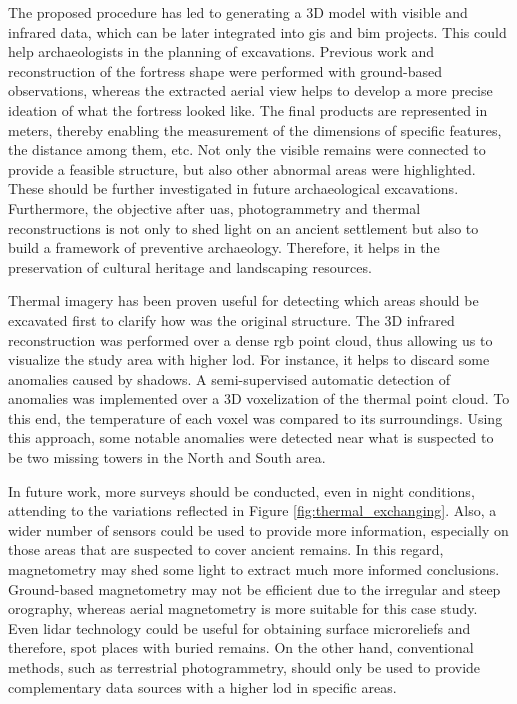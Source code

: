 The proposed procedure has led to generating a 3D model with visible and infrared data, which can be later integrated into \acrshort{gis} and \acrshort{bim} projects. This could help archaeologists in the planning of excavations. Previous work and reconstruction of the fortress shape were performed with ground-based observations, whereas the extracted aerial view helps to develop a more precise ideation of what the fortress looked like. The final products are represented in meters, thereby enabling the measurement of the dimensions of specific features, the distance among them, etc. Not only the visible remains were connected to provide a feasible structure, but also other abnormal areas were highlighted. These should be further investigated in future archaeological excavations. Furthermore, the objective after \acrshort{uas}, photogrammetry and thermal reconstructions is not only to shed light on an ancient settlement but also to build a framework of preventive archaeology. Therefore, it helps in the preservation of cultural heritage and landscaping resources. 

Thermal imagery has been proven useful for detecting which areas should be excavated first to clarify how was the original structure. The 3D infrared reconstruction was performed over a dense \acrshort{rgb} point cloud, thus allowing us to visualize the study area with higher \acrshort{lod}. For instance, it helps to discard some anomalies caused by shadows. A semi-supervised automatic detection of anomalies was implemented over a 3D voxelization of the thermal point cloud. To this end, the temperature of each voxel was compared to its surroundings. Using this approach, some notable anomalies were detected near what is suspected to be two missing towers in the North and South area.   

In future work, more surveys should be conducted, even in night conditions, attending to the variations reflected in Figure \ref{fig:thermal_exchanging}. Also, a wider number of sensors could be used to provide more information, especially on those areas that are suspected to cover ancient remains. In this regard, magnetometry may shed some light to extract much more informed conclusions. Ground-based magnetometry may not be efficient due to the irregular and steep orography, whereas aerial magnetometry is more suitable for this case study. Even \acrshort{lidar} technology could be useful for obtaining surface microreliefs and therefore, spot places with buried remains. On the other hand, conventional methods, such as terrestrial photogrammetry, should only be used to provide complementary data sources with a higher \acrshort{lod} in specific areas.

